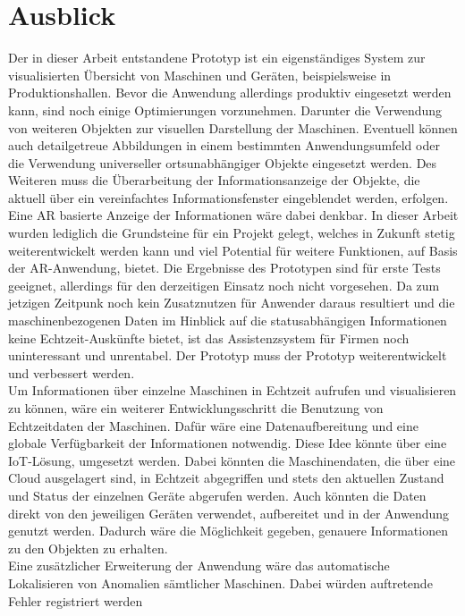 \chapter{Ausblick}
\label{chap:Ausblick}
Der in dieser Arbeit entstandene Prototyp ist ein eigenständiges System zur visualisierten Übersicht von Maschinen und Geräten, beispielsweise in Produktionshallen. 
Bevor die Anwendung allerdings produktiv eingesetzt werden kann, sind noch einige Optimierungen vorzunehmen. Darunter die Verwendung von weiteren Objekten 
zur visuellen Darstellung der Maschinen. Eventuell können auch detailgetreue Abbildungen in einem bestimmten Anwendungsumfeld oder die Verwendung universeller 
ortsunabhängiger Objekte eingesetzt werden. Des Weiteren muss die Überarbeitung der Informationsanzeige der Objekte, die aktuell über ein vereinfachtes Informationsfenster 
eingeblendet werden, erfolgen. Eine \acl{AR} basierte Anzeige der Informationen wäre dabei denkbar. In dieser Arbeit wurden lediglich die Grundsteine für ein Projekt 
gelegt, welches in Zukunft stetig weiterentwickelt werden kann und viel Potential für weitere Funktionen, auf Basis der \acs{AR}-Anwendung, bietet. Die Ergebnisse 
des Prototypen sind für erste Tests geeignet, allerdings für den derzeitigen Einsatz noch nicht vorgesehen. Da zum jetzigen Zeitpunk noch kein Zusatznutzen für Anwender 
daraus resultiert und die maschinenbezogenen Daten im Hinblick auf die statusabhängigen Informationen keine Echtzeit-Auskünfte bietet, ist das Assistenzsystem für Firmen 
noch uninteressant und unrentabel. Der Prototyp muss der Prototyp weiterentwickelt und verbessert werden. 
\\ 
\linebreak
Um Informationen über einzelne Maschinen in Echtzeit aufrufen und visualisieren zu können, wäre ein weiterer Entwicklungsschritt die Benutzung von Echtzeitdaten der 
Maschinen. Dafür wäre eine Datenaufbereitung und eine globale Verfügbarkeit der Informationen notwendig. Diese Idee könnte über eine \acl{IoT}-Lösung, umgesetzt werden. 
Dabei könnten die Maschinendaten, die über eine Cloud ausgelagert sind, in Echtzeit abgegriffen und stets den aktuellen Zustand und Status der einzelnen Geräte 
abgerufen werden. Auch könnten die Daten direkt von den jeweiligen Geräten verwendet, aufbereitet und in der Anwendung genutzt werden. Dadurch wäre die Möglichkeit 
gegeben, genauere Informationen zu den Objekten zu erhalten.
\\ 
\linebreak
Eine zusätzlicher Erweiterung der Anwendung wäre das automatische Lokalisieren von Anomalien sämtlicher Maschinen. Dabei würden auftretende Fehler registriert werden 

